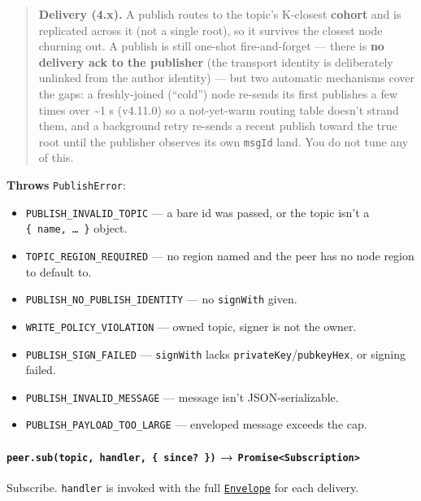 \documentclass[
  nobib]{tufte-handout}
\providecommand{\tightlist}{%
  \setlength{\itemsep}{0pt}\setlength{\parskip}{0pt}}
\begin{document}
\begin{quote}
\textbf{Delivery (4.x).} A publish routes to the topic's K-closest
\textbf{cohort} and is replicated across it (not a single root), so it
survives the closest node churning out. A publish is still one-shot
fire-and-forget --- there is \textbf{no delivery ack to the publisher}
(the transport identity is deliberately unlinked from the author
identity) --- but two automatic mechanisms cover the gaps: a
freshly-joined (``cold'') node re-sends its first publishes a few times
over \textasciitilde1 s (v4.11.0) so a not-yet-warm routing table
doesn't strand them, and a background retry re-sends a recent publish
toward the true root until the publisher observes its own \texttt{msgId}
land. You do not tune any of this.
\end{quote}

\textbf{Throws} \texttt{PublishError}:

\begin{itemize}
\tightlist
\item
  \texttt{PUBLISH\_INVALID\_TOPIC} --- a bare id was passed, or the
  topic isn't a \texttt{\{\ name,\ …\ \}} object.
\item
  \texttt{TOPIC\_REGION\_REQUIRED} --- no region named and the peer has
  no node region to default to.
\item
  \texttt{PUBLISH\_NO\_PUBLISH\_IDENTITY} --- no \texttt{signWith}
  given.
\item
  \texttt{WRITE\_POLICY\_VIOLATION} --- owned topic, signer is not the
  owner.
\item
  \texttt{PUBLISH\_SIGN\_FAILED} --- \texttt{signWith} lacks
  \texttt{privateKey}/\texttt{pubkeyHex}, or signing failed.
\item
  \texttt{PUBLISH\_INVALID\_MESSAGE} --- message isn't
  JSON-serializable.
\item
  \texttt{PUBLISH\_PAYLOAD\_TOO\_LARGE} --- enveloped message exceeds
  the cap.
\end{itemize}

\paragraph{\texorpdfstring{\texttt{peer.sub(topic,\ handler,\ \{\ since?\ \})}
→
\texttt{Promise\textless{}Subscription\textgreater{}}}{peer.sub(topic, handler, \{ since? \}) → Promise\textless Subscription\textgreater{}}}\label{peer.subtopic-handler-since-promisesubscription}

Subscribe. \texttt{handler} is invoked with the full
\hyperref[envelope-type]{\texttt{Envelope}} for each delivery.
\end{document}
